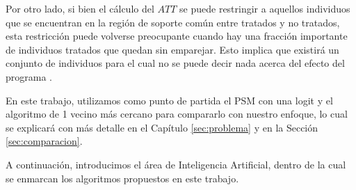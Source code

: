 \documentclass[../../main.tex]{subfiles}
\begin{document}
Por otro lado, si bien el cálculo del \(ATT\) se puede restringir a aquellos individuos
que se encuentran en la región de soporte común entre tratados y no tratados, esta
restricción puede volverse preocupante cuando hay una fracción importante de individuos
tratados que quedan sin emparejar. Esto implica que existirá un conjunto de individuos
para el cual no se puede decir nada acerca del efecto del programa \cite{bernal}.

\bigskip
En este trabajo, utilizamos como punto de partida el PSM con una logit y el algoritmo de 1
vecino más cercano para compararlo con nuestro enfoque, lo cual se explicará con más
detalle en el Capítulo \ref{sec:problema} y en la Sección \ref{sec:comparacion}.

A continuación, introducimos el área de Inteligencia Artificial, dentro de la cual se
enmarcan los algoritmos propuestos en este trabajo.
\end{document}
